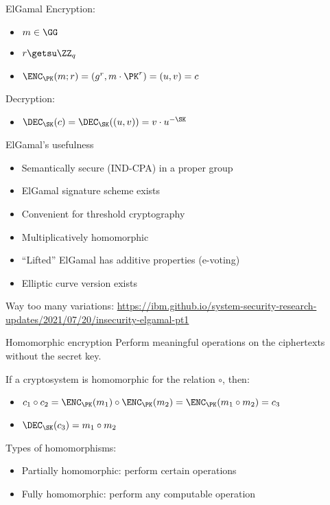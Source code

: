 \begin{frame}{ElGamal}
  Encryption:
  \begin{itemize}[<+(1)->]
    \item $m\in\GG$
    \item $r\getsu\ZZ_q$
    \item $\ENC_\PK(m; r) = (g^r, m\cdot \PK^r) = (u, v) = c$
  \end{itemize}

  \vspace*{2em}

  \pause
  Decryption:
  \begin{itemize}
    \item $\DEC_\SK(c) = \DEC_\SK((u, v)) = v \cdot u^{-\SK}$
  \end{itemize}
\end{frame}

\begin{frame}{ElGamal's usefulness}
  \begin{itemize}[<+(1)->]
    \item Semantically secure (IND-CPA) in a proper group
    \item ElGamal signature scheme exists
    \item Convenient for threshold cryptography
    \item Multiplicatively homomorphic
    \item \enquote{Lifted} ElGamal has additive properties (e-voting)
    \item Elliptic curve version exists
  \end{itemize}

  \pause
  Way too many variations: \url{https://ibm.github.io/system-security-research-updates/2021/07/20/insecurity-elgamal-pt1}
\end{frame}

\begin{frame}{Homomorphic encryption}
  Perform meaningful operations on the ciphertexts without the secret key.

  \vspace*{1em}

  \pause
  If a cryptosystem is homomorphic for the relation $\circ$, then:
  \begin{itemize}[<+(1)->]
    \item $c_1 \circ c_2 = \ENC_\PK(m_1) \circ \ENC_\PK(m_2) = \ENC_\PK(m_1 \circ m_2) = c_3$
    \item $\DEC_\SK(c_3) = m_1 \circ m_2$
  \end{itemize}

  \vspace*{1em}

  \pause
  Types of homomorphisms:
  \begin{itemize}[<+(1)->]
    \item Partially homomorphic: perform certain operations
    \item Fully homomorphic: perform any computable operation
  \end{itemize}
\end{frame}

